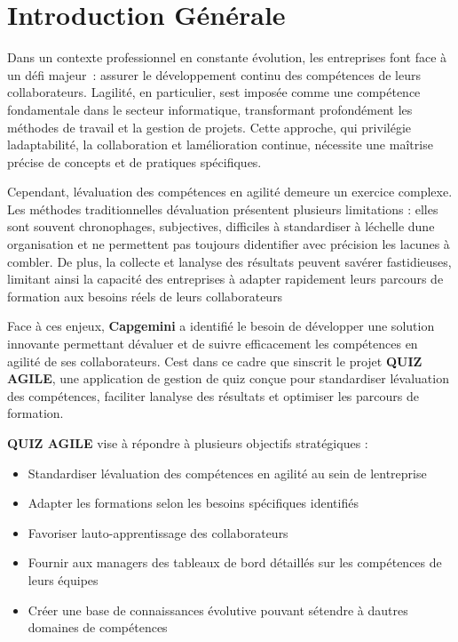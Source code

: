 \documentclass[12pt,a4paper,twoside,openright]{report}
\let\origchapter\chapter
\renewcommand{\chapter}[1]{%
  \cleardoublepage%
  \origchapter{#1}%
}
\begin{document}
\cleardoublepage

\chapter{Introduction Générale}

Dans un contexte professionnel en constante évolution, les entreprises
font face à un défi majeur~: assurer le développement continu des
compétences de leurs collaborateurs. L\textquotesingle agilité, en
particulier, s\textquotesingle est imposée comme une compétence
fondamentale dans le secteur informatique, transformant profondément les
méthodes de travail et la gestion de projets. Cette approche, qui
privilégie l\textquotesingle adaptabilité, la collaboration et
l\textquotesingle amélioration continue, nécessite une maîtrise précise
de concepts et de pratiques spécifiques.

Cependant, l\textquotesingle évaluation des compétences en agilité
demeure un exercice complexe. Les méthodes traditionnelles
d\textquotesingle évaluation présentent plusieurs limitations : elles
sont souvent chronophages, subjectives, difficiles à standardiser à
l\textquotesingle échelle d\textquotesingle une organisation et ne
permettent pas toujours d\textquotesingle identifier avec précision les
lacunes à combler. De plus, la collecte et l\textquotesingle analyse des
résultats peuvent s\textquotesingle avérer fastidieuses, limitant ainsi
la capacité des entreprises à adapter rapidement leurs parcours de
formation aux besoins réels de leurs collaborateurs

Face à ces enjeux, \textbf{Capgemini} a identifié le besoin de
développer une solution innovante permettant d\textquotesingle évaluer
et de suivre efficacement les compétences en agilité de ses
collaborateurs. C\textquotesingle est dans ce cadre que
s\textquotesingle inscrit le projet \textbf{QUIZ AGILE}, une application
de gestion de quiz conçue pour standardiser l\textquotesingle évaluation
des compétences, faciliter l\textquotesingle analyse des résultats et
optimiser les parcours de formation.

\textbf{QUIZ AGILE} vise à répondre à plusieurs objectifs stratégiques :

\begin{itemize}
\item
  Standardiser l\textquotesingle évaluation des compétences en agilité
  au sein de l\textquotesingle entreprise
\item
  Adapter les formations selon les besoins spécifiques identifiés
\item
  Favoriser l\textquotesingle auto-apprentissage des collaborateurs
\item
  Fournir aux managers des tableaux de bord détaillés sur les
  compétences de leurs équipes
\item
  Créer une base de connaissances évolutive pouvant
  s\textquotesingle étendre à d\textquotesingle autres domaines de
  compétences
\end{itemize}
\end{document}
